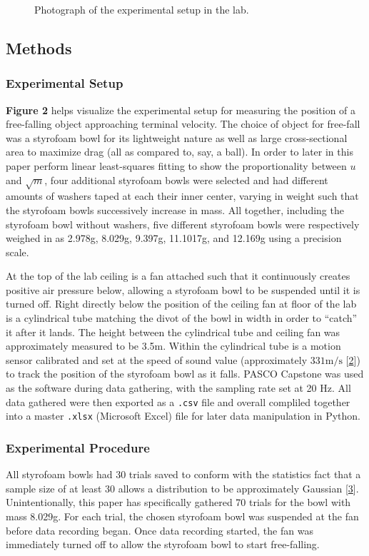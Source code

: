 \documentclass[12pt]{article}
\begin{document}
\begin{multicols}{2}
\begin{figure}[H]
    \caption{Photograph of the experimental setup in the lab.}
    \label{fig:2}
\end{figure}
\subsection{Methods}
\subsubsection{Experimental Setup}
\textbf{Figure 2} helps visualize the experimental setup for measuring the position of a free-falling object approaching terminal velocity.
The choice of object for free-fall was a styrofoam bowl for its lightweight nature as well as large cross-sectional area to maximize drag (all as compared to, say, a ball).
In order to later in this paper perform linear least-squares fitting to show the proportionality between $u$ and $\sqrt{m}$,
four additional styrofoam bowls were selected and had different amounts of washers taped at each their inner center,
varying in weight such that the styrofoam bowls successively increase in mass.
All together, including the styrofoam bowl without washers, five different styrofoam bowls were respectively weighed in as 2.978g, 8.029g, 9.397g, 11.1017g, and 12.169g using a precision scale.

At the top of the lab ceiling is a fan attached such that it continuously creates positive air pressure below, allowing a styrofoam bowl to be suspended until it is turned off.
Right directly below the position of the ceiling fan at floor of the lab is a cylindrical tube matching the divot of the bowl in width in order to ``catch'' it after it lands.
The height between the cylindrical tube and ceiling fan was approximately measured to be 3.5m.
Within the cylindrical tube is a motion sensor calibrated and set at the speed of sound value (approximately $331\mathrm{m/s}$ [\hyperref[sec:2]{2}]) to track the position of the styrofoam bowl as it falls.
PASCO Capstone was used as the software during data gathering, with the sampling rate set at 20 Hz.
All data gathered were then exported as a \texttt{.csv} file and overall compliled together into a master \texttt{.xlsx} (Microsoft Excel) file for later data manipulation in Python.

\subsubsection{Experimental Procedure}
All styrofoam bowls had 30 trials saved to conform with the statistics fact that a sample size of at least 30 allows a distribution to be approximately Gaussian [\hyperref[sec:3]{3}].
Unintentionally, this paper has specifically gathered 70 trials for the bowl with mass 8.029g.
For each trial, the chosen styrofoam bowl was suspended at the fan before data recording began.
Once data recording started, the fan was immediately turned off to allow the styrofoam bowl to start free-falling.


\end{multicols}
\end{document}
